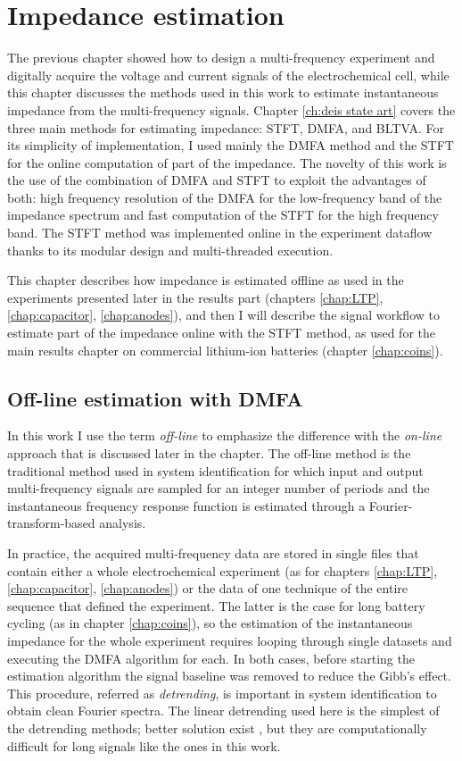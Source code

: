 \chapter{Impedance estimation}
\label{chap:estimation}

The previous chapter showed how to design a multi-frequency experiment and digitally acquire the voltage and current signals of the electrochemical cell, while this chapter discusses the methods used in this work to estimate instantaneous impedance from the multi-frequency signals.
Chapter \ref{ch:deis state art} covers the three main methods for estimating impedance: STFT, DMFA, and BLTVA. For its simplicity of implementation, I used mainly the DMFA method and the STFT for the online computation of part of the impedance.
The novelty of this work is the use of the combination of DMFA and STFT to exploit the advantages of both: high frequency resolution of the DMFA for the low-frequency band of the impedance spectrum and fast computation of the STFT for the high frequency band.
The STFT method was implemented online in the experiment dataflow thanks to its modular design and multi-threaded execution.

This chapter describes how impedance is estimated offline as used in the experiments presented later in the results part (chapters \ref{chap:LTP}, \ref{chap:capacitor}, \ref{chap:anodes}), and then I will describe the signal workflow to estimate part of the impedance online with the STFT method, as used for the main results chapter on commercial lithium-ion batteries (chapter \ref{chap:coins}).

\section{Off-line estimation with DMFA}
In this work I use the term \emph{off-line} to emphasize the difference with the \emph{on-line} approach that is discussed later in the chapter.
The off-line method is the traditional method used in system identification for which input and output multi-frequency signals are sampled for an integer number of periods and the instantaneous frequency response function is estimated through a Fourier-transform-based analysis. 

In practice, the acquired multi-frequency data are stored in single files that contain either a whole electrochemical experiment (as for chapters \ref{chap:LTP}, \ref{chap:capacitor}, \ref{chap:anodes}) or the data of one technique of the entire sequence that defined the experiment.
The latter is the case for long battery cycling (as in chapter \ref{chap:coins}), so the estimation of the instantaneous impedance for the whole experiment requires looping through single datasets and executing the DMFA algorithm for each.
In both cases, before starting the estimation algorithm the signal baseline was removed to reduce the Gibb's effect.
This procedure, referred as \emph{detrending}, is important in system identification to obtain clean Fourier spectra.
The linear detrending used here is the simplest of the detrending methods; better solution exist \cite{hallemansTrendRemovalMeasurements2022, lentkaMethodsTrendRemoval2019}, but they are computationally difficult for long signals like the ones in this work.

